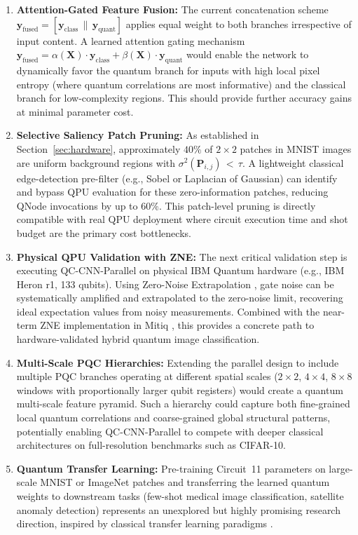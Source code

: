 \documentclass[journal]{IEEEtran}
\begin{document}
\begin{enumerate}
    \item \textbf{Attention-Gated Feature Fusion:} The current concatenation scheme $\mathbf{y}_{\mathrm{fused}} = [\mathbf{y}_{\mathrm{class}} \,\|\, \mathbf{y}_{\mathrm{quant}}]$ applies equal weight to both branches irrespective of input content. A learned attention gating mechanism $\mathbf{y}_{\mathrm{fused}} = \alpha(\mathbf{X}) \cdot \mathbf{y}_{\mathrm{class}} + \beta(\mathbf{X}) \cdot \mathbf{y}_{\mathrm{quant}}$ would enable the network to dynamically favor the quantum branch for inputs with high local pixel entropy (where quantum correlations are most informative) and the classical branch for low-complexity regions. This should provide further accuracy gains at minimal parameter cost.

    \item \textbf{Selective Saliency Patch Pruning:} As established in Section~\ref{sec:hardware}, approximately $40\%$ of $2 \times 2$ patches in MNIST images are uniform background regions with $\sigma^2(\mathbf{P}_{i,j}) \,{<}\, \tau$. A lightweight classical edge-detection pre-filter (e.g., Sobel or Laplacian of Gaussian) can identify and bypass QPU evaluation for these zero-information patches, reducing QNode invocations by up to $60\%$. This patch-level pruning is directly compatible with real QPU deployment where circuit execution time and shot budget are the primary cost bottlenecks.

    \item \textbf{Physical QPU Validation with ZNE:} The next critical validation step is executing QC-CNN-Parallel on physical IBM Quantum hardware (e.g., IBM Heron r1, 133 qubits). Using Zero-Noise Extrapolation \cite{temme2017error, koczor2021exponential}, gate noise can be systematically amplified and extrapolated to the zero-noise limit, recovering ideal expectation values from noisy measurements. Combined with the near-term ZNE implementation in Mitiq \cite{cai2023quantum}, this provides a concrete path to hardware-validated hybrid quantum image classification.

    \item \textbf{Multi-Scale PQC Hierarchies:} Extending the parallel design to include multiple PQC branches operating at different spatial scales ($2 \times 2$, $4 \times 4$, $8 \times 8$ windows with proportionally larger qubit registers) would create a quantum multi-scale feature pyramid. Such a hierarchy could capture both fine-grained local quantum correlations and coarse-grained global structural patterns, potentially enabling QC-CNN-Parallel to compete with deeper classical architectures on full-resolution benchmarks such as CIFAR-10.

    \item \textbf{Quantum Transfer Learning:} Pre-training Circuit~11 parameters on large-scale MNIST or ImageNet patches and transferring the learned quantum weights to downstream tasks (few-shot medical image classification, satellite anomaly detection) represents an unexplored but highly promising research direction, inspired by classical transfer learning paradigms \cite{biamonte2017quantum, dunjko2018machine}.
\end{enumerate}
\end{document}
